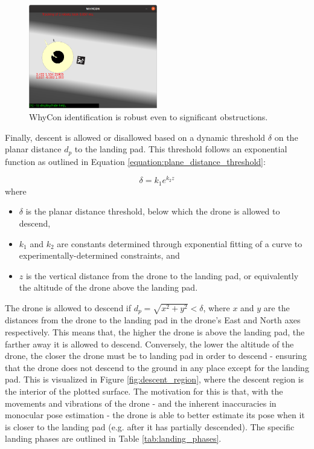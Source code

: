 \begin{figure}[ht]
    \centering
    \includegraphics[width=0.5\textwidth]{images/whycon_robust.png}
    \caption{WhyCon identification is robust even to significant obstructions.}
    \label{fig:whycon_robust}
\end{figure}

Finally, descent is allowed or disallowed based on a dynamic threshold $\delta$ on the planar distance $d_p$ to the landing pad. This threshold follows an exponential function as outlined in Equation \ref{equation:plane_distance_threshold}:

\begin{equation}
    \delta = k_1e^{k_2 z}
    \label{equation:plane_distance_threshold}
\end{equation}
where
\begin{itemize}
    \item $\delta$ is the planar distance threshold, below which the drone is allowed to descend,
    \item $k_1$ and $k_2$ are constants determined through exponential fitting of a curve to experimentally-determined constraints, and
    \item $z$ is the vertical distance from the drone to the landing pad, or equivalently the altitude of the drone above the landing pad.
\end{itemize}

The drone is allowed to descend if $d_p = \sqrt{x^2 + y^2} < \delta$, where $x$ and $y$ are the distances from the drone to the landing pad in the drone's East and North axes respectively. This means that, the higher the drone is above the landing pad, the farther away it is allowed to descend. Conversely, the lower the altitude of the drone, the closer the drone must be to landing pad in order to descend - ensuring that the drone does not descend to the ground in any place except for the landing pad. This is visualized in Figure \ref{fig:descent_region}, where the descent region is the interior of the plotted surface. The motivation for this is that, with the movements and vibrations of the drone - and the inherent inaccuracies in monocular pose estimation - the drone is able to better estimate its pose when it is closer to the landing pad (e.g. after it has partially descended). The specific landing phases are outlined in Table \ref{tab:landing_phases}.

